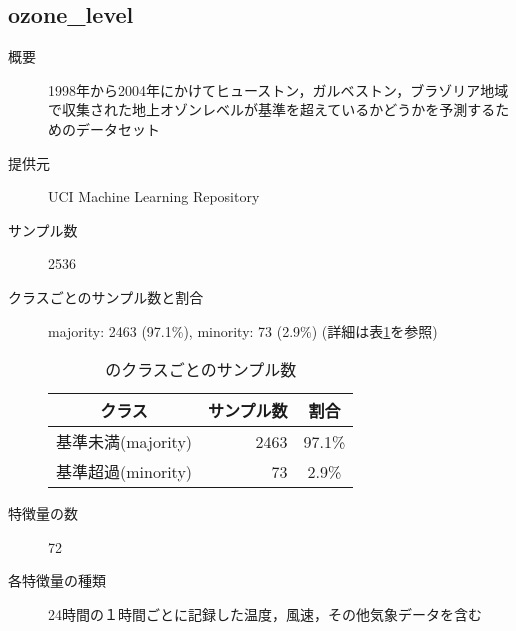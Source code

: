 \subsection{ozone\_level}
\begin{description}
    \item[概要] 1998年から2004年にかけてヒューストン，ガルベストン，ブラゾリア地域で収集された地上オゾンレベルが基準を超えているかどうかを予測するためのデータセット\cite{ozonelevel}
    \item[提供元] UCI Machine Learning Repository
    \item[サンプル数] 2536
    \item[クラスごとのサンプル数と割合] majority: 2463 (97.1\%), minority: 73 (2.9\%) (詳細は表\ref{tab:}を参照)

        \begin{table}[htbp]
            \centering
            \caption{のクラスごとのサンプル数}
            \label{tab:}
            \begin{tabular}{lrc} \hline
                \multicolumn{1}{c}{クラス}&
                \multicolumn{1}{c}{サンプル数}&
                \multicolumn{1}{c}{割合}\\
                \hline
                \hline

                基準未満(majority) & 2463 & 97.1\% \\
                基準超過(minority) & 73 & 2.9\% \\

                \hline
            \end{tabular}
        \end{table}

    \item[特徴量の数] 72
    \item[各特徴量の種類] 24時間の１時間ごとに記録した温度，風速，その他気象データを含む
\end{description}


